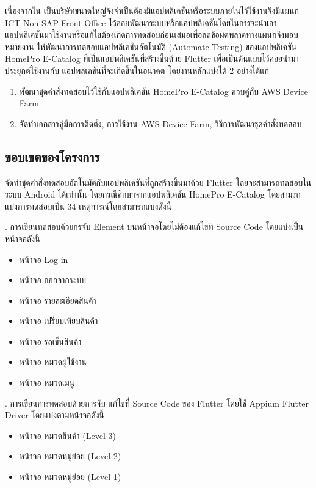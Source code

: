    เนื่องจากใน {\Company} เป็นบริษัทขนาดใหญ่จึงจำเป็นต้องมีแอปพลิเคชันหรือระบบภายในไว้ใช้งานจึงมีแผนก ICT Non SAP Front Office
    ไว้คอยพัฒนาระบบหรือแอปพลิเคชันโดยในการจะนำเอาแอปพลิเคชันมาใช้งานหรือแก้ไขต้องเกิดการทดสอบก่อนเสมอเพื่อลดข้อผิดพลาดทางแผนกจึงมอบหมายงาน
    ให้พัฒนาการทดสอบแอปพลิเคชันอัตโนมัติ (Automate Testing) ของแอปพลิเคชัน HomePro E-Catalog ที่เป็นแอปพลิเคชันที่สร้างขึ้นด้วย Flutter เพื่อเป็นต้นแบบไว้คอยนำมาประยุกต์ใช้งานกับ
    แอปพลิเคชันที่จะเกิดขึ้นในอนาคต โดยงานหลักแบ่งได้ 2 อย่างได้แก่
    
    \begin{enumerate}
        \item พัฒนาชุดคำสั่งทดสอบไว้ใช้กับแอปพลิเคชัน HomePro E-Catalog ควบคู่กับ AWS Device Farm
        \item จัดทำเอกสารคู่มือการติดตั้ง, การใช้งาน AWS Device Farm, วิธีการพัฒนาชุดคำสั่งทดสอบ
    \end{enumerate}

    \subsection{ขอบเขตของโครงการ}
        จัดทำชุดคำสั่งทดสอบอัตโนมัติกับแอปพลิเคชันที่ถูกสร้างขึ้นมาด้วย Flutter โดยจะสามารถทดสอบในระบบ Android ได้เท่านั้น โดยกรณีศึกษาจากแอปพลิเคชัน HomePro E-Catalog
        โดยสามรถแบ่งการทดสอบเป็น 34 เหตุการณ์โดยสามารถแบ่งดังนี้
        
        . การเขียนทดสอบด้วยกรจับ Element บนหน้าจอโดยไม่ต้องแก้ไขที่ Source Code โดยแบ่งเป็นหน้าจอดังนี้
            \begin{itemize}
                \item หน้าจอ Log-in
                \item หน้าจอ ออกจากระบบ
                \item หน้าจอ รายละเอียดสินค้า
                \item หน้าจอ เปรียบเทียบสินค้า
                \item หน้าจอ รถเข็นสินค้า
                \item หน้าจอ หมวดผู้ใช้งาน
                \item หน้าจอ หมวดเมนู
            \end{itemize}

        . การเขียนการทดสอบด้วยการจับ แก้ไขที่ Source Code ของ Flutter โดยใช้ Appium Flutter Driver โดยแบ่งตามหน้าจอดังนี้
            \begin{itemize}
                \item หน้าจอ หมวดสินค้า (Level 3)
                \item หน้าจอ หมวดหมู่ย่อย (Level 2)
                \item หน้าจอ หมวดหมู่ย่อย (Level 1)
            \end{itemize}

